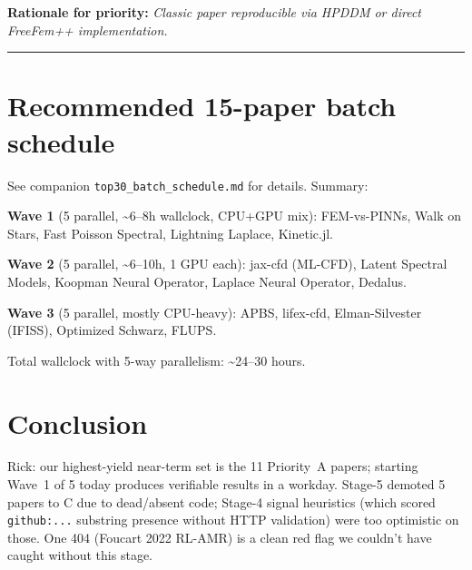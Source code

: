 \documentclass[10pt,letterpaper]{article}
\begin{document}
\textbf{Rationale for priority:} \emph{Classic paper reproducible via HPDDM or direct FreeFem++ implementation.}

\medskip\hrule\medskip

\section{Recommended 15-paper batch schedule}

See companion \texttt{top30\_batch\_schedule.md} for details. Summary:

\textbf{Wave 1} (5 parallel, \textasciitilde 6--8h wallclock, CPU+GPU mix): FEM-vs-PINNs, Walk on Stars, Fast Poisson Spectral, Lightning Laplace, Kinetic.jl.

\textbf{Wave 2} (5 parallel, \textasciitilde 6--10h, 1 GPU each): jax-cfd (ML-CFD), Latent Spectral Models, Koopman Neural Operator, Laplace Neural Operator, Dedalus.

\textbf{Wave 3} (5 parallel, mostly CPU-heavy): APBS, lifex-cfd, Elman-Silvester (IFISS), Optimized Schwarz, FLUPS.

Total wallclock with 5-way parallelism: \textasciitilde 24--30 hours.

\section{Conclusion}

Rick: our highest-yield near-term set is the 11 Priority~A papers; starting Wave~1 of 5 today produces verifiable results in a workday. Stage-5 demoted 5 papers to C due to dead/absent code; Stage-4 signal heuristics (which scored \texttt{github:...} substring presence without HTTP validation) were too optimistic on those. One 404 (Foucart 2022 RL-AMR) is a clean red flag we couldn't have caught without this stage.
\end{document}
